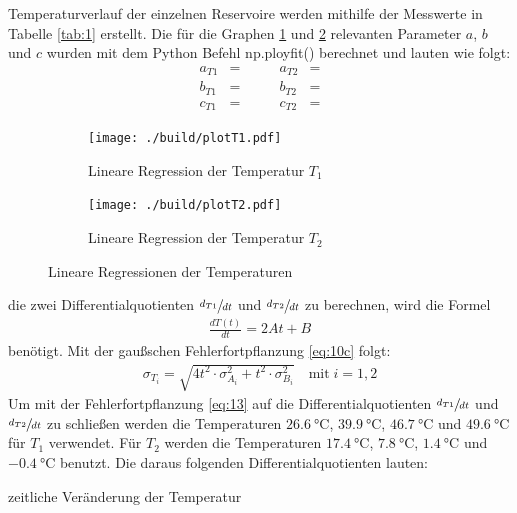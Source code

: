 \justifying Temperaturverlauf der einzelnen Reservoire werden mithilfe der Messwerte in Tabelle \ref{tab:1} erstellt. Die für
die Graphen \ref{fig:3a} und \ref{fig:3b} relevanten Parameter $a$, $b$ und $c$ wurden mit dem Python Befehl np.ployfit() \cite{numpy}
berechnet und lauten wie folgt:
\begin{subequations}
\begin{align}
    a_{T1} &= \text{} \qquad &a_{T2} &= \text{} \label{eq:11a}\\
    b_{T1} &= \text{} \qquad &b_{T2} &= \text{} \label{eq:11b}\\
    c_{T1} &= \text{} \qquad &c_{T2} &= \text{} \label{eq:11c}
\end{align}
\end{subequations}

\begin{figure}[H]
    \begin{subfigure}{0.495\linewidth}
        \centering
        \texttt{[image: ./build/plotT1.pdf]}
        \caption{Lineare Regression der Temperatur $T_1$}
        \label{fig:3a}
    \end{subfigure}
    \begin{subfigure}{0.495\linewidth}
        \centering
        \texttt{[image: ./build/plotT2.pdf]}
        \caption{Lineare Regression der Temperatur $T_2$}
        \label{fig:3b}
    \end{subfigure}
    \caption{Lineare Regressionen der Temperaturen}
    \label{fig:3}
\end{figure}

\justifying die zwei Differentialquotienten $\sfrac{d_{T1}}{dt}$ und $\sfrac{d_{T2}}{dt}$ zu berechnen, wird die Formel
\begin{align}
    \frac{dT(t)}{dt} = 2At + B \label{eq:12}
\end{align}
benötigt. Mit der gaußschen Fehlerfortpflanzung \eqref{eq:10c} folgt:
\begin{align}
    \sigma_{T_i} = \sqrt{4t^2 \cdot \sigma _{A_i}^2 + t^2 \cdot \sigma _{B_i}^2} \label{eq:13}\quad \text{mit}\; i = 1,2
\end{align}
Um mit der Fehlerfortpflanzung \eqref{eq:13} auf die Differentialquotienten $\sfrac{d_{T1}}{dt}$ und $\sfrac{d_{T2}}{dt}$ zu schließen werden die 
Temperaturen $\SI{26.6}{\celsius}$, $\SI{39.9}{\celsius}$, $\SI{46.7}{\celsius}$ und $\SI{49.6}{\celsius}$ für $T_1$ verwendet. Für $T_2$ 
werden die Temperaturen $\SI{17.4}{\celsius}$, $\SI{7.8}{\celsius}$, $\SI{1.4}{\celsius}$ und $\SI{-0.4}{\celsius}$ benutzt.
Die daraus folgenden Differentialquotienten lauten:
\begin{table}
    \centering
    
    \caption{zeitliche Veränderung der Temperatur} \label{tab:2}
\end{table}


